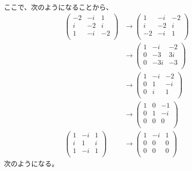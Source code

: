 \documentclass[dvipdfmx]{jsarticle}
\begin{document}
ここで、次のようになることから、
\begin{align*}
\begin{pmatrix}
 - 2 & - i & 1 \\
i & - 2 & i \\
1 & - i & - 2 \\
\end{pmatrix} &\rightarrow \begin{pmatrix}
1 & - i & - 2 \\
i & - 2 & i \\
 - 2 & - i & 1 \\
\end{pmatrix}\\
&\rightarrow \begin{pmatrix}
1 & - i & - 2 \\
0 & - 3 & 3i \\
0 & - 3i & - 3 \\
\end{pmatrix}\\
&\rightarrow \begin{pmatrix}
1 & - i & - 2 \\
0 & 1 & - i \\
0 & i & 1 \\
\end{pmatrix}\\
&\rightarrow \begin{pmatrix}
1 & 0 & - 1 \\
0 & 1 & - i \\
0 & 0 & 0 \\
\end{pmatrix}\\
\begin{pmatrix}
1 & - i & 1 \\
i & 1 & i \\
1 & - i & 1 \\
\end{pmatrix} &\rightarrow \begin{pmatrix}
1 & - i & 1 \\
0 & 0 & 0 \\
0 & 0 & 0 \\
\end{pmatrix}
\end{align*}
次のようになる。
\end{document}
